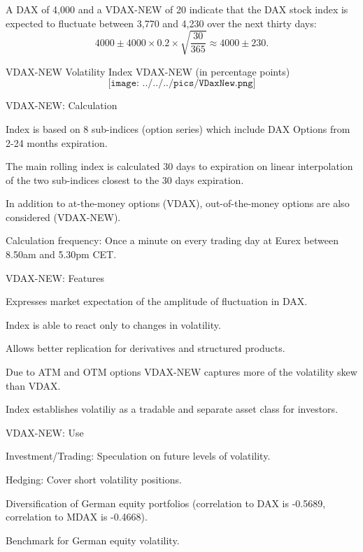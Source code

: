 	A DAX of 4,000 and a VDAX-NEW of 20 indicate that the DAX stock index is
expected to fluctuate between 3,770 and 4,230 over the next thirty days:
$$4000\pm4000\times0.2\times\sqrt{\frac{30}{365}}\approx4000\pm230.$$


{VDAX-NEW}
Volatility Index VDAX-NEW (in percentage points)
$$\texttt{[image: ../../../pics/VDaxNew.png]}$$

{VDAX-NEW: Calculation}


	 Index is based on 8 sub-indices (option series) which include DAX Options from 2-24 months expiration.

	 The main rolling index is calculated 30 days to expiration on linear interpolation of the two sub-indices closest to the 30 days expiration.

	 In addition to at-the-money options (VDAX), out-of-the-money options are also considered (VDAX-NEW).

	 Calculation frequency: Once a minute on every trading day at Eurex between 8.50am and 5.30pm CET.


{VDAX-NEW: Features}


	 Expresses market expectation of the amplitude of fluctuation in DAX.

	 Index is able to react only to changes in volatility.

	 Allows better replication for derivatives and structured products.

	 Due to ATM and OTM options VDAX-NEW captures more of the volatility skew than VDAX.

	 Index establishes volatiliy as a tradable and separate asset class for investors.


{VDAX-NEW: Use}


	 Investment/Trading: Speculation on future levels of volatility.

	 Hedging: Cover short volatility positions.

	 Diversification of German equity portfolios (correlation to DAX is -0.5689, correlation to MDAX is -0.4668).

	 Benchmark for German equity volatility.

